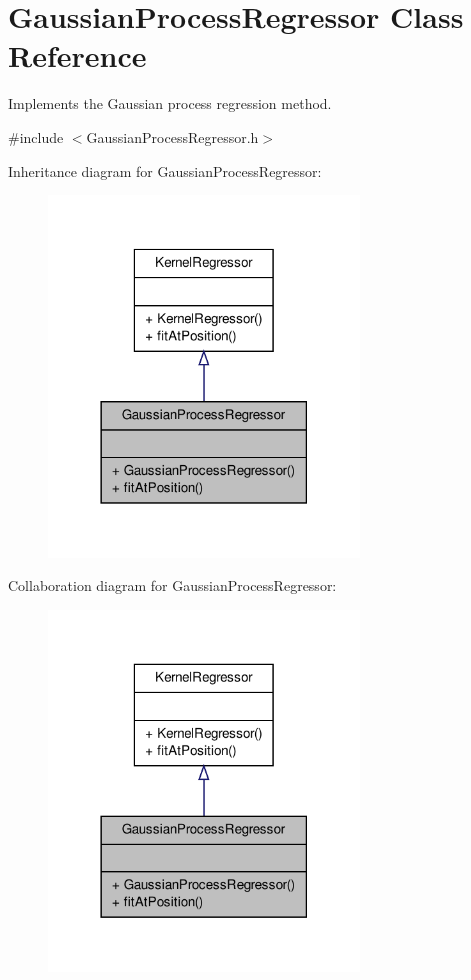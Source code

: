\hypertarget{classGaussianProcessRegressor}{\section{\-Gaussian\-Process\-Regressor \-Class \-Reference}
\label{classGaussianProcessRegressor}
}


\-Implements the \-Gaussian process regression method.  




{\ttfamily \#include $<$\-Gaussian\-Process\-Regressor.\-h$>$}



\-Inheritance diagram for \-Gaussian\-Process\-Regressor\-:\nopagebreak
\begin{figure}[H]
\begin{center}
\leavevmode
\includegraphics[width=234pt]{classGaussianProcessRegressor__inherit__graph}
\end{center}
\end{figure}


\-Collaboration diagram for \-Gaussian\-Process\-Regressor\-:\nopagebreak
\begin{figure}[H]
\begin{center}
\leavevmode
\includegraphics[width=234pt]{classGaussianProcessRegressor__coll__graph}
\end{center}
\end{figure}
